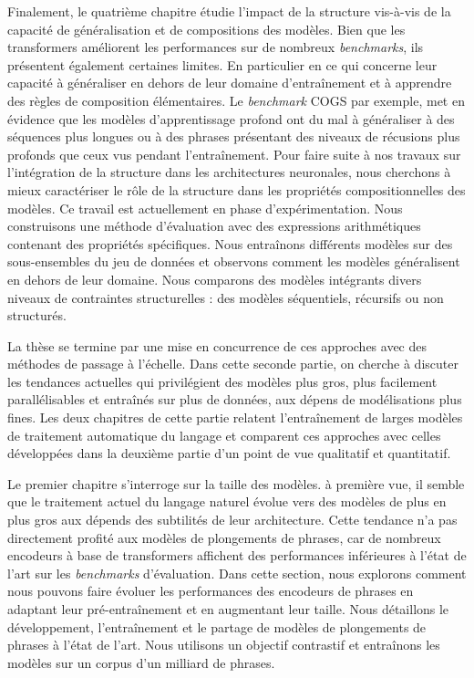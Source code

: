 Finalement, le quatrième chapitre étudie l’impact de la structure vis-à-vis de la capacité de généralisation et de compositions des modèles. Bien que les transformers améliorent les performances sur de nombreux \textit{benchmarks}, ils présentent également certaines limites. En particulier en ce qui concerne leur capacité à généraliser en dehors de leur domaine d'entraînement et à apprendre des règles de composition élémentaires. Le \textit{benchmark} COGS par exemple, met en évidence que les modèles d'apprentissage profond ont du mal à généraliser à des séquences plus longues ou à des phrases présentant des niveaux de récusions plus profonds que ceux vus pendant l'entraînement. Pour faire suite à nos travaux sur l'intégration de la structure dans les architectures neuronales, nous cherchons à mieux caractériser le rôle de la structure dans les propriétés compositionnelles des modèles. Ce travail est actuellement en phase d'expérimentation. Nous construisons une méthode d'évaluation avec des expressions arithmétiques contenant des propriétés spécifiques. Nous entraînons différents modèles sur des sous-ensembles du jeu de données et observons comment les modèles généralisent en dehors de leur domaine. Nous comparons des modèles intégrants divers niveaux de contraintes structurelles : des modèles séquentiels, récursifs ou non structurés.

La thèse se termine par une mise en concurrence de ces approches avec des méthodes de passage à l’échelle. Dans cette seconde partie, on cherche à discuter les tendances actuelles qui privilégient des modèles plus gros, plus facilement parallélisables et entraînés sur plus de données, aux dépens de modélisations plus fines. Les deux chapitres de cette partie relatent l'entraînement de larges modèles de traitement automatique du langage et comparent ces approches avec celles développées dans la deuxième partie d’un point de vue qualitatif et quantitatif. 

Le premier chapitre s’interroge sur la taille des modèles. à première vue, il semble que le traitement actuel du langage naturel évolue vers des modèles de plus en plus gros aux dépends des subtilités de leur architecture. Cette tendance n’a pas directement profité aux modèles de plongements de phrases, car de nombreux encodeurs à base de transformers affichent des performances inférieures à l'état de l'art sur les \textit{benchmarks} d’évaluation. Dans cette section, nous explorons comment nous pouvons faire évoluer les performances des encodeurs de phrases en adaptant leur pré-entraînement et en augmentant leur taille. Nous détaillons le développement, l'entraînement et le partage de modèles de plongements de phrases à l’état de l’art. Nous utilisons un objectif contrastif et entraînons les modèles sur un corpus d'un milliard de phrases. 

